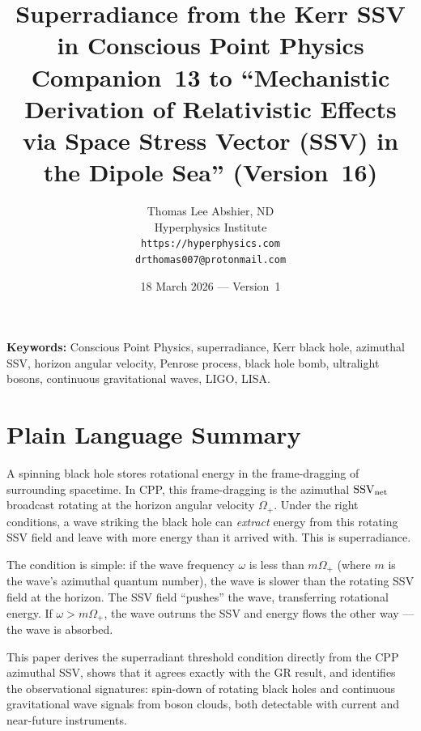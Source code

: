 \documentclass[12pt]{article}
\title{\textbf{Superradiance from the Kerr SSV\\
in Conscious Point Physics}\\[6pt]
{\large Companion~13 to ``Mechanistic Derivation of Relativistic Effects\\
via Space Stress Vector (SSV) in the Dipole Sea'' (Version~16)}}
\author{Thomas Lee Abshier, ND\\
Hyperphysics Institute\\
\texttt{https://hyperphysics.com}\\
\texttt{drthomas007@protonmail.com}}
\date{18 March 2026 --- Version~1}
\newcommand{\Oplus}{\Omega_+}
\newcommand{\SSV}{\mathrm{SSV}}
\begin{document}
\maketitle

\noindent\textbf{Keywords:} Conscious Point Physics, superradiance,
Kerr black hole, azimuthal SSV, horizon angular velocity, Penrose
process, black hole bomb, ultralight bosons, continuous gravitational
waves, LIGO, LISA.

\section*{Plain Language Summary}

A spinning black hole stores rotational energy in the frame-dragging
of surrounding spacetime.  In CPP, this frame-dragging is the
azimuthal $\SSV_{\rm net}$ broadcast rotating at the horizon angular
velocity $\Oplus$.  Under the right conditions, a wave striking the
black hole can \emph{extract} energy from this rotating SSV field and
leave with more energy than it arrived with.  This is superradiance.

The condition is simple: if the wave frequency $\omega$ is less than
$m\Oplus$ (where $m$ is the wave's azimuthal quantum number), the
wave is slower than the rotating SSV field at the horizon.  The SSV
field ``pushes'' the wave, transferring rotational energy.  If
$\omega > m\Oplus$, the wave outruns the SSV and energy flows the
other way — the wave is absorbed.

This paper derives the superradiant threshold condition directly from
the CPP azimuthal SSV, shows that it agrees exactly with the GR result,
and identifies the observational signatures: spin-down of rotating
black holes and continuous gravitational wave signals from boson
clouds, both detectable with current and near-future instruments.
\end{document}
